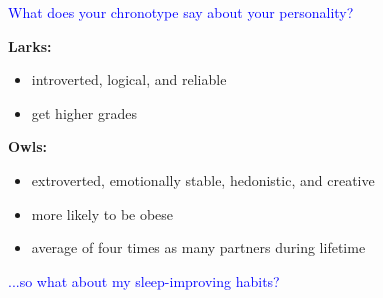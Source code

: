 \documentclass[landscape]{slides}
\begin{document}
\begin{slide}

    \textcolor{blue}{\Large{What does your chronotype say about your personality?}}

    \textbf{Larks:}

    \begin{itemize}
        \item introverted, logical, and reliable
        \item get higher grades
    \end{itemize}

    \textbf{Owls:}

    \begin{itemize}
        \item extroverted, emotionally stable, hedonistic, and creative
        \item more likely to be obese
        \item average of four times as many partners during lifetime
    \end{itemize}

\end{slide}




\begin{slide}

    \textcolor{blue}{\Large{...so what about my sleep-improving habits?}}

\end{slide}
\end{document}
